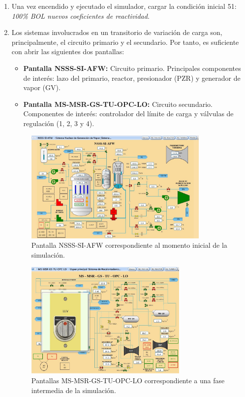 \begin{enumerate}
  \item Una vez encendido y ejecutado el simulador, cargar la condición inicial 51: \textit{100\% BOL nuevos coeficientes de reactividad}.
  
  \item Los sistemas involucrados en un transitorio de variación de carga son, principalmente, el circuito primario y el secundario. Por tanto, es suficiente con abrir las siguientes dos pantallas:
  \begin{itemize}
    \item \textbf{Pantalla NSSS-SI-AFW:} Circuito primario. Principales componentes de interés: lazo del primario, reactor, presionador (PZR) y generador de vapor (GV).
    \item \textbf{Pantalla MS-MSR-GS-TU-OPC-LO:} Circuito secundario. Componentes de interés: controlador del límite de carga y válvulas de regulación (1, 2, 3 y 4).
    \end{itemize}

  \begin{figure}[h!]
    \centering
    \includegraphics[width=0.85\textwidth]{content/figures/pantalla1_simulacion1.JPG}
    \caption{Pantalla NSSS-SI-AFW correspondiente al momento inicial de la simulación.}
    \label{fig:pantalla1_simulacion1}
  \end{figure}

  \begin{figure}[h!]
    \centering
    \includegraphics[width=0.75\textwidth]{content/figures/pantalla2_simulacion2.JPG}
    \caption{Pantallas MS-MSR-GS-TU-OPC-LO correspondiente a una fase intermedia de la simulación.}
    \label{fig:pantalla2_simulacion1}
  \end{figure}


\end{enumerate}
